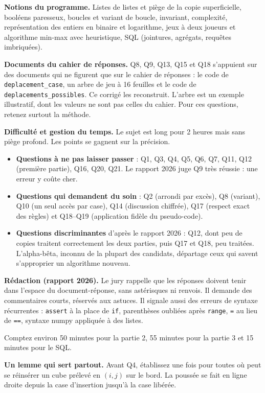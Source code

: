 \documentclass[11pt,a4paper]{article}
\providecommand{\tightlist}{\setlength{\itemsep}{0pt}\setlength{\parskip}{0pt}}
\begin{document}
\textbf{Notions du programme.} Listes de listes et piège de la copie superficielle, booléens paresseux, boucles et variant de boucle, invariant, complexité, représentation des entiers en binaire et logarithme, jeux à deux joueurs et algorithme min-max avec heuristique, SQL (jointures, agrégats, requêtes imbriquées).

\textbf{Documents du cahier de réponses.} Q8, Q9, Q13, Q15 et Q18 s'appuient sur des documents qui ne figurent que sur le cahier de réponses : le code de \texttt{deplacement\_case}, un arbre de jeu à 16 feuilles et le code de \texttt{deplacements\_possibles}. Ce corrigé les reconstruit. L'arbre est un exemple illustratif, dont les valeurs ne sont pas celles du cahier. Pour ces questions, retenez surtout la méthode.

\textbf{Difficulté et gestion du temps.} Le sujet est long pour 2 heures mais sans piège profond. Les points se gagnent sur la précision.

\begin{itemize}
\tightlist
\item
  \textbf{Questions à ne pas laisser passer} : Q1, Q3, Q4, Q5, Q6, Q7, Q11, Q12 (première partie), Q16, Q20, Q21. Le rapport 2026 juge Q9 très réussie : une erreur y coûte cher.
\item
  \textbf{Questions qui demandent du soin} : Q2 (arrondi par excès), Q8 (variant), Q10 (un seul accès par case), Q14 (discussion chiffrée), Q17 (respect exact des règles) et Q18--Q19 (application fidèle du pseudo-code).
\item
  \textbf{Questions discriminantes} d'après le rapport 2026 : Q12, dont peu de copies traitent correctement les deux parties, puis Q17 et Q18, peu traitées. L'alpha-bêta, inconnu de la plupart des candidats, départage ceux qui savent s'approprier un algorithme nouveau.
\end{itemize}

\textbf{Rédaction (rapport 2026).} Le jury rappelle que les réponses doivent tenir dans l'espace du document-réponse, sans astérisques ni renvois. Il demande des commentaires courts, réservés aux astuces. Il signale aussi des erreurs de syntaxe récurrentes : \texttt{assert} à la place de \texttt{if}, parenthèses oubliées après \texttt{range}, \texttt{=} au lieu de \texttt{==}, syntaxe numpy appliquée à des listes.

Comptez environ 50 minutes pour la partie 2, 55 minutes pour la partie 3 et 15 minutes pour le SQL.

\textbf{Un lemme qui sert partout.} Avant Q4, établissez une fois pour toutes où peut se réinsérer un cube prélevé en \((i,j)\) sur le bord. La poussée se fait en ligne droite depuis la case d'insertion jusqu'à la case libérée.
\end{document}
